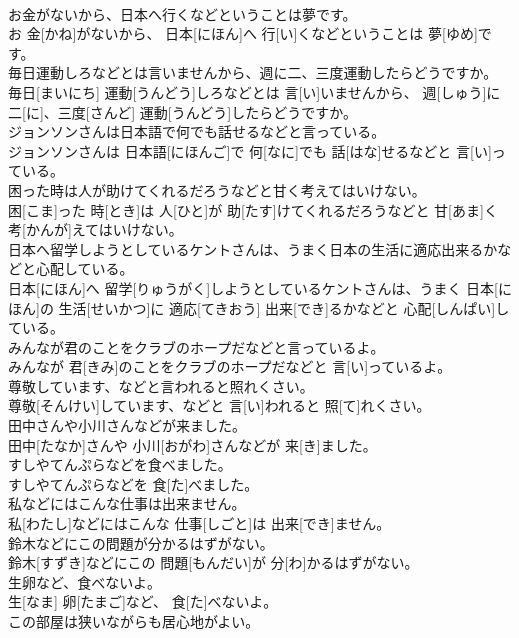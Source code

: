 \documentclass[8pt]{extreport}
\begin{document}
\begin{CJK}{UTF8}{min}
\\	お金がないから、日本へ行くなどということは夢です。	
\\	お 金[かね]がないから、 日本[にほん]へ 行[い]くなどということは 夢[ゆめ]です。
\\	毎日運動しろなどとは言いませんから、週に二、三度運動したらどうですか。	
\\	毎日[まいにち] 運動[うんどう]しろなどとは 言[い]いませんから、 週[しゅう]に二[に]、三度[さんど] 運動[うんどう]したらどうですか。
\\	ジョンソンさんは日本語で何でも話せるなどと言っている。	
\\	ジョンソンさんは 日本語[にほんご]で 何[なに]でも 話[はな]せるなどと 言[い]っている。
\\	困った時は人が助けてくれるだろうなどと甘く考えてはいけない。	
\\	困[こま]った 時[とき]は 人[ひと]が 助[たす]けてくれるだろうなどと 甘[あま]く 考[かんが]えてはいけない。
\\	日本へ留学しようとしているケントさんは、うまく日本の生活に適応出来るかなどと心配している。	
\\	日本[にほん]へ 留学[りゅうがく]しようとしているケントさんは、うまく 日本[にほん]の 生活[せいかつ]に 適応[てきおう] 出来[でき]るかなどと 心配[しんぱい]している。
\\	みんなが君のことをクラブのホープだなどと言っているよ。	
\\	みんなが 君[きみ]のことをクラブのホープだなどと 言[い]っているよ。
\\	尊敬しています、などと言われると照れくさい。	
\\	尊敬[そんけい]しています、などと 言[い]われると 照[て]れくさい。
\\	田中さんや小川さんなどが来ました。	
\\	田中[たなか]さんや 小川[おがわ]さんなどが 来[き]ました。
\\	すしやてんぷらなどを食べました。	
\\	すしやてんぷらなどを 食[た]べました。
\\	私などにはこんな仕事は出来ません。	
\\	私[わたし]などにはこんな 仕事[しごと]は 出来[でき]ません。
\\	鈴木などにこの問題が分かるはずがない。	
\\	鈴木[すずき]などにこの 問題[もんだい]が 分[わ]かるはずがない。
\\	生卵など、食べないよ。	
\\	生[なま] 卵[たまご]など、 食[た]べないよ。
\\	この部屋は狭いながらも居心地がよい。	

\end{CJK}
\end{document}
